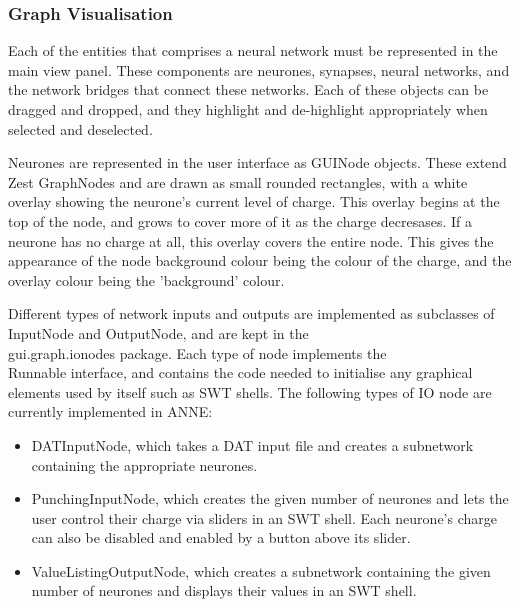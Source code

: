 \documentclass{acm_proc_article-sp}
\begin{document}
\subsubsection{Graph Visualisation}
{
Each of the entities that comprises a neural network must be represented in the main view panel. These components are neurones, synapses, neural networks, and the network bridges that connect these networks. Each of these objects can be dragged and dropped, and they highlight and de-highlight appropriately when selected and deselected.

Neurones are represented in the user interface as GUINode objects. These extend Zest GraphNodes and are drawn as small rounded rectangles, with a white overlay showing the neurone's current level of charge. This overlay begins at the top of the node, and grows to cover more of it as the charge decresases. If a neurone has no charge at all, this overlay covers the entire node. This gives the appearance of the node background colour being the colour of the charge, and the overlay colour being the 'background' colour.

Different types of network inputs and outputs are implemented as subclasses of InputNode and OutputNode, and are kept in the \\gui.graph.ionodes package. Each type of node implements the \\Runnable interface, and contains the code needed to initialise any graphical elements used by itself such as SWT shells. The following types of IO node are currently implemented in ANNE:
\newpage
\begin{itemize}
\item {
DATInputNode, which takes a DAT input file and creates a subnetwork containing the appropriate neurones.
}
\item {
PunchingInputNode, which creates the given number of neurones and lets the user control their charge via sliders in an SWT shell. Each neurone's charge can also be disabled and enabled by a button above its slider.
}
\item {
ValueListingOutputNode, which creates a subnetwork containing the given number of neurones and displays their values in an SWT shell.
}
\end{itemize}

}
\end{document}
